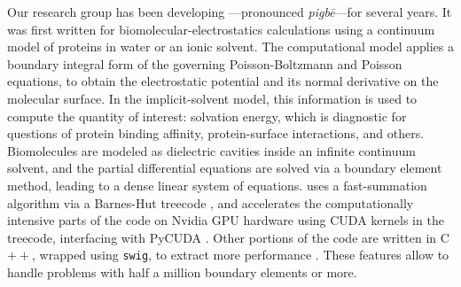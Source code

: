 Our research group has been developing \pygbe---pronounced \emph{pigb\={e}}---for several years. 
It was first written for biomolecular-electrostatics calculations using a continuum model of proteins in water or an ionic solvent. 
The computational model applies a boundary integral form of the governing Poisson-Boltzmann and Poisson equations, to obtain the electrostatic potential and its normal derivative on the molecular surface. 
In the implicit-solvent model, this information is used to compute the quantity of interest: solvation energy, which is diagnostic for questions of protein binding affinity, protein-surface interactions, and others. 
Biomolecules are modeled as dielectric cavities inside an infinite continuum solvent, and the partial differential equations are solved via a boundary element method, leading to a dense linear system of equations. 
\pygbe uses a fast-summation algorithm via a Barnes-Hut treecode \cite{BarnesHut1986}, and accelerates the computationally intensive parts of the code on Nvidia GPU hardware using CUDA kernels in the treecode, interfacing with PyCUDA \cite{klockner2012pycuda}. 
Other portions of the code are written in C$++$, wrapped using \texttt{swig}, to extract more performance \cite{CooperETal2016}. 
These features allow \pygbe to handle problems with half a million boundary elements or more. 

